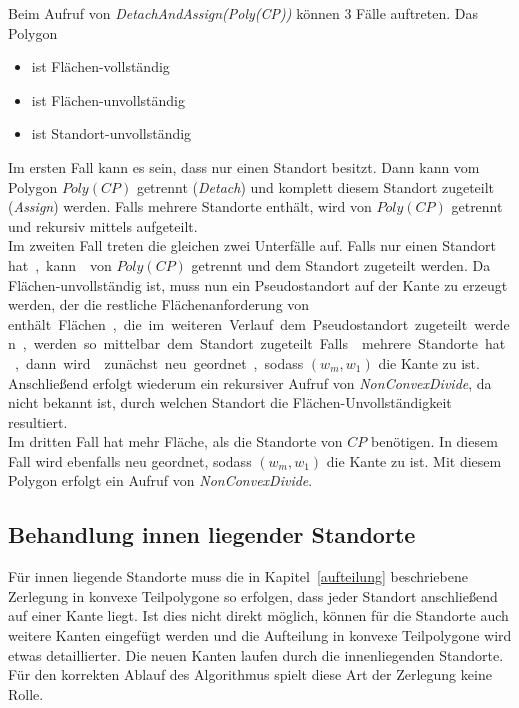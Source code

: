 \documentclass[ngerman]{seminarbeitrag}
\begin{document}
Beim Aufruf von \emph{DetachAndAssign(Poly(CP))} können 3 Fälle auftreten. Das Polygon
\begin{itemize}
\item {} ist Flächen-vollständig
\item {} ist Flächen-unvollständig
\item {} ist Standort-unvollständig
\end{itemize}
Im ersten Fall kann es sein, dass  nur einen Standort besitzt. Dann kann  vom Polygon $Poly(CP)$ getrennt (\emph{Detach}) und komplett diesem Standort zugeteilt (\emph{Assign}) werden.
Falls  mehrere Standorte enthält, wird  von $Poly(CP)$ getrennt und rekursiv mittels \noncon aufgeteilt. \\
Im zweiten Fall treten die gleichen zwei Unterfälle auf. Falls  nur einen Standort \si hat, kann  von $Poly(CP)$ getrennt und dem Standort zugeteilt werden. Da  Flächen-unvollständig ist, muss nun ein Pseudostandort auf der Kante zu  erzeugt werden, der die restliche Flächenanforderung von \si enthält. Flächen, die im weiteren Verlauf dem Pseudostandort zugeteilt werden, werden so mittelbar dem Standort \si zugeteilt.
Falls  mehrere Standorte hat, dann wird  zunächst neu geordnet, sodass $(w_{m}, w_{1})$ die Kante zu  ist. Anschließend erfolgt wiederum ein rekursiver Aufruf von \mbox{\textit{NonConvexDivide}}, da nicht bekannt ist, durch welchen Standort die Flächen-Unvollständigkeit resultiert.\\
Im dritten Fall hat  mehr Fläche, als die Standorte von $CP$ benötigen. In diesem Fall wird  ebenfalls neu geordnet, sodass $(w_{m}, w_{1})$ die Kante zu  ist. Mit diesem Polygon erfolgt ein Aufruf von \mbox{\textit{NonConvexDivide}}.

\subsection{Behandlung innen liegender Standorte}\label{innere Standorte}
Für innen liegende Standorte muss die in Kapitel~\ref{aufteilung} beschriebene Zerlegung in konvexe Teilpolygone so erfolgen, dass jeder Standort anschließend auf einer Kante liegt. Ist dies nicht direkt möglich, können für die Standorte auch weitere Kanten eingefügt werden und die Aufteilung in konvexe Teilpolygone wird etwas detaillierter. Die neuen Kanten laufen durch die innenliegenden Standorte. Für den korrekten Ablauf des Algorithmus spielt diese Art der Zerlegung keine Rolle.
\end{document}
